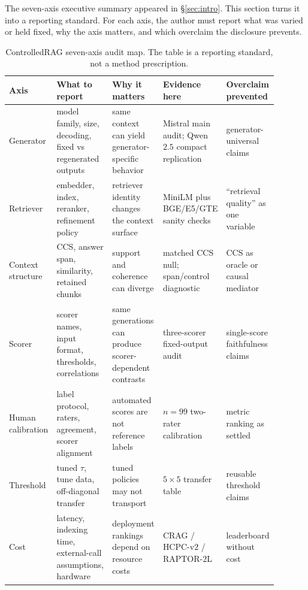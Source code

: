 The seven-axis executive summary appeared in \S\ref{sec:intro}. This
section turns it into a reporting standard. For each axis, the author
must report what was varied or held fixed, why the axis matters, and
which overclaim the disclosure prevents.

\begin{table}[!htb]
\centering
\caption{ControlledRAG seven-axis audit map. The table is a reporting
standard, not a method prescription.}
\label{tab:controlledrag_audit_map}
\scriptsize
\setlength{\tabcolsep}{2pt}
\begin{tabular}{@{}p{0.12\linewidth}p{0.21\linewidth}p{0.21\linewidth}p{0.18\linewidth}p{0.17\linewidth}@{}}
\toprule
Axis & What to report & Why it matters & Evidence here & Overclaim prevented \\
\midrule
Generator & model family, size, decoding, fixed vs regenerated outputs &
same context can yield generator-specific behavior & Mistral main audit; Qwen$2.5$ compact replication &
generator-universal claims \\
Retriever & embedder, index, reranker, refinement policy &
retriever identity changes the context surface & MiniLM plus BGE/E5/GTE sanity checks &
``retrieval quality'' as one variable \\
Context structure & CCS, answer span, similarity, retained chunks &
support and coherence can diverge & matched CCS null; span/control diagnostic &
CCS as oracle or causal mediator \\
Scorer & scorer names, input format, thresholds, correlations &
same generations can produce scorer-dependent contrasts & three-scorer fixed-output audit &
single-score faithfulness claims \\
Human calibration & label protocol, raters, agreement, scorer alignment &
automated scores are not reference labels & $n=99$ two-rater calibration &
metric ranking as settled \\
Threshold & tuned $\tau$, tune data, off-diagonal transfer &
tuned policies may not transport & $5\times5$ transfer table &
reusable threshold claims \\
Cost & latency, indexing time, external-call assumptions, hardware &
deployment rankings depend on resource costs & CRAG / HCPC-v$2$ / RAPTOR-$2$L &
leaderboard without cost \\
\bottomrule
\end{tabular}
\end{table}

